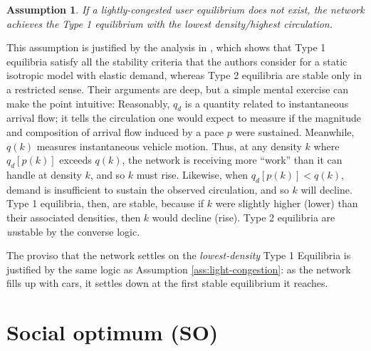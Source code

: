 \documentclass[preprint,authoryear]{elsarticle}
\newtheorem{assumption}{Assumption}
\begin{document}
\begin{assumption}\label{ass:type1}
If a lightly-congested user equilibrium does not exist, the network achieves the Type 1 equilibrium with the lowest density/highest circulation.
\end{assumption}

This assumption is justified by the analysis in \citet{Arnott2010}, which shows that Type 1 equilibria satisfy all the stability criteria that the authors consider for a static isotropic model with elastic demand, whereas Type 2 equilibria are stable only in a restricted sense. Their arguments are deep, but a simple mental exercise can make the point intuitive: Reasonably, $q_d$ is a quantity related to instantaneous arrival flow; it tells the circulation one would expect to measure if the magnitude and composition of arrival flow induced by a pace $p$ were sustained. Meanwhile, $q(k)$  measures instantaneous vehicle motion. Thus, at any density $k$ where $q_d[p(k)]$ exceeds $q(k)$, the network is  receiving more ``work'' than it can handle at density $k$, and so $k$ must rise. Likewise, when $q_d[p(k)]<q(k)$, demand is insufficient to sustain the observed circulation, and so $k$ will decline. Type 1 equilibria, then, are stable, because if $k$ were slightly higher (lower) than their associated densities, then $k$ would decline (rise). Type 2 equilibria are \emph{un}stable by the converse logic.

The proviso that the network settles on the \emph{lowest-density} Type 1 Equilibria is justified by the same logic as Assumption \ref{ass:light-congestion}: as the network fills up with cars, it settles down at the first stable equilibrium it reaches. 

\section{Social optimum (SO)}
\label{sec:social_optimum}
\end{document}
